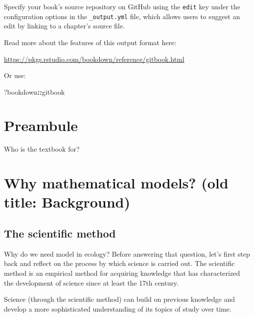 \documentclass[
]{book}
\newenvironment{Shaded}{\begin{snugshade}}{\end{snugshade}}
\newcommand{\NormalTok}[1]{#1}
\newcommand{\SpecialCharTok}[1]{\textcolor[rgb]{0.81,0.36,0.00}{\textbf{#1}}}
\theoremstyle{definition}
\theoremstyle{definition}
\theoremstyle{definition}
\theoremstyle{definition}
\theoremstyle{remark}
\begin{document}
Specify your book's source repository on GitHub using the \texttt{edit} key under the configuration options in the \texttt{\_output.yml} file, which allows users to suggest an edit by linking to a chapter's source file.

Read more about the features of this output format here:

\url{https://pkgs.rstudio.com/bookdown/reference/gitbook.html}

Or use:

\begin{Shaded}
\begin{Highlighting}[]
\NormalTok{?bookdown}\SpecialCharTok{::}\NormalTok{gitbook}
\end{Highlighting}
\end{Shaded}

\chapter{Preambule}\label{preambule}

Who is the textbook for?

\chapter{Why mathematical models? (old title: Background)}\label{why-mathematical-models-old-title-background}

\section{The scientific method}\label{the-scientific-method}

Why do we need model in ecology? Before answering that question, let's first step back and reflect on the process by which science is carried out. The scientific method is an empirical method for acquiring knowledge that has characterized the development of science since at least the 17th century.

Science (through the scientific method) can build on previous knowledge and develop a more sophisticated understanding of its topics of study over time.
\end{document}
